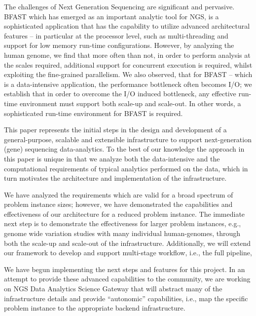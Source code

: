 \documentclass{sig-alternate}
\begin{document}
The challenges of Next Generation Sequencing are significant
and pervasive.
BFAST which has emerged as an important analytic tool for NGS, is  a sophisticated application that has the
capability to utilize advanced architectural features -- in particular
at the processor level, such as multi-threading and support for low
memory run-time configurations. However, by analyzing the human
genome, we find that more often than not, in order to perform analysis
at the scales required, additional support for concurrent execution is
required, whilst exploiting the fine-grained parallelism. We also
observed, that for BFAST -- which is a data-intensive application,
the performance bottleneck often becomes I/O; we establish that in
order to overcome the I/O induced bottleneck, any effective run-time
environment must support both scale-up and scale-out. In other words,
a sophisticated run-time environment for BFAST is required.

This paper represents the initial steps in the design and development
of a general-purpose, scalable and extensible infrastructure to
support next-generation (gene) sequencing data-analytics. To the best
of our knowledge the approach in this paper is unique in that we
analyze both the data-intensive and the computational requirements of
typical analytics performed on the data, which in turn motivates the
architecture and implementation of the infrastructure. 

We have analyzed the requirements which are valid for a broad spectrum
of problem instance sizes; however, we have demonstrated the
capabilities and effectiveness of our architecture for a reduced
problem instance. The immediate next step is to demonstrate the
effectiveness for larger problem instances, e.g., genome wide variation studies with many individual human-genomes,
through both the scale-up and scale-out of the infrastructure.
Additionally, we will extend our framework to develop and support
multi-stage workflow, i.e., the full pipeline,
 
We have begun implementing the next steps and features for this
project. In an attempt to provide these advanced capabilities to the
community, we are working on NGS Data Analytics Science Gateway that
will abstract many of the infrastructure details and provide
``autonomic'' capabilities, i.e., map the specific problem instance to
the appropriate backend infrastructure.

\end{document}

